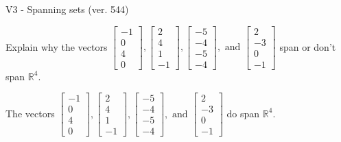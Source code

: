 \begin{exercise}
  \begin{exerciseTitle}V3 - Spanning sets (ver. 544)\end{exerciseTitle}
  \begin{exerciseStatement}
    Explain why the vectors \(\left[\begin{array}{r}
-1 \\
0 \\
4 \\
0
\end{array}\right] , \left[\begin{array}{r}
2 \\
4 \\
1 \\
-1
\end{array}\right] , \left[\begin{array}{r}
-5 \\
-4 \\
-5 \\
-4
\end{array}\right] , \text{ and } \left[\begin{array}{r}
2 \\
-3 \\
0 \\
-1
\end{array}\right]\) span or don't span \(\mathbb{R}^4\). 
	


  \end{exerciseStatement}
  \begin{exerciseAnswer}
   The vectors \(\left[\begin{array}{r}
-1 \\
0 \\
4 \\
0
\end{array}\right] , \left[\begin{array}{r}
2 \\
4 \\
1 \\
-1
\end{array}\right] , \left[\begin{array}{r}
-5 \\
-4 \\
-5 \\
-4
\end{array}\right] , \text{ and } \left[\begin{array}{r}
2 \\
-3 \\
0 \\
-1
\end{array}\right]\) 
  	 do  
	span \(\mathbb{R}^4\).
  


  \end{exerciseAnswer}
\end{exercise}